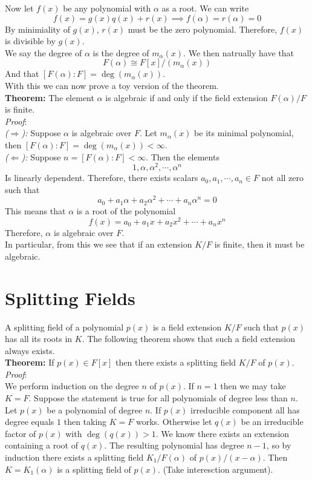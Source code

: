 \documentclass[11pt]{article}
\begin{document}
Now let $f(x)$ be any polynomial with $\alpha$ as a root. We can write 
\[f(x)=g(x)q(x)+r(x)\implies f(\alpha)=r(\alpha)=0\]
By minimiality of $g(x)$, $r(x)$ must be the zero polynomial. Therefore, $f(x)$ is divisible by $g(x)$. \\

We say the degree of $\alpha$ is the degree of $m_{\alpha}(x)$. We then natrually have that 
\[F(\alpha) \cong F[x] / (m_{\alpha}(x))\]
And that $[F(\alpha):F]=\deg(m_{\alpha}(x))$.\\

With this we can now prove a toy version of the theorem.\\

\textbf{Theorem:} The element $\alpha$ is algebraic if and only if the field extension $F(\alpha)/F$ is finite.\\

\textit{Proof}:\\
\textit{($\Rightarrow$):} Suppose $\alpha$ is algebraic over $F$. Let $m_{\alpha}(x)$ be its minimal polynomial, then $[F(\alpha):F]=\deg(m_{\alpha}(x))<\infty$.\\

\textit{($\Leftarrow$):} Suppose $n=[F(\alpha):F]<\infty$. Then the elements 
\[1, \alpha, \alpha^2, \cdots, \alpha^{n}\]
Is linearly dependent. Therefore, there exists scalars $a_0, a_1, \cdots, a_n \in F$ not all zero such that 
\[a_0 + a_1 \alpha + a_2 \alpha^2 + \cdots + a_n \alpha^n = 0\]
This means that $\alpha$ is a root of the polynomial 
\[f(x)=a_0 + a_1 x + a_2 x^2 + \cdots + a_n x^n\]
Therefore, $\alpha$ is algebraic over $F$. \\

In particular, from this we see that if an extension $K/F$ is finite, then it must be algebraic. 

\section{Splitting Fields}

A splitting field of a polynomial $p(x)$ is a field extension $K/F$ such that $p(x)$ has all its roots in $K$. The following theorem shows that such a field extension always exists.\\

\textbf{Theorem:} If $p(x)\in F[x]$ then there exists a splitting field $K/F$ of $p(x)$. \\

\textit{Proof}:\\
We perform induction on the degree $n$ of $p(x)$. If $n=1$ then we may take $K=F$. Suppose the statement is true for all polynomials of degree less than $n$. Let $p(x)$ be a polynomial of degree $n$. If $p(x)$ irreducible component all has degree equals $1$ then taking $K=F$ works. Otherwise let $q(x)$ be an irreducible factor of $p(x)$ with $\deg(q(x))>1$. We know there exists an extension containing a root of $q(x)$. The resulting polynomial has degree $n-1$, so by induction there exists a splitting field $K_1/F(\alpha)$ of $p(x)/(x-\alpha)$. Then $K=K_1(\alpha)$ is a splitting field of $p(x)$. (Take interesction argument).
\end{document}
